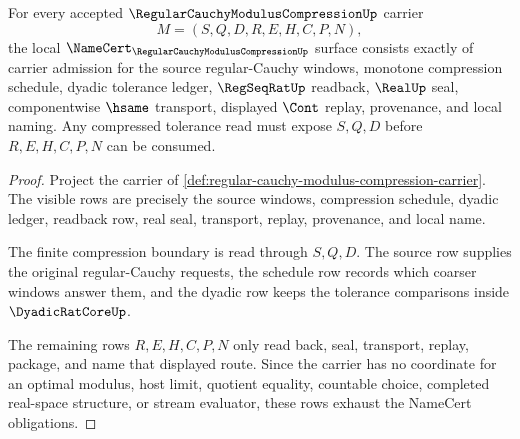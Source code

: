 \begin{theorem}
\label{thm:regular-cauchy-modulus-compression-namecert-obligations}
For every accepted $\RegularCauchyModulusCompressionUp$ carrier
$$
M=(S,Q,D,R,E,H,C,P,N),
$$
the local $\NameCert_{\RegularCauchyModulusCompressionUp}$ surface consists exactly of carrier admission for the source regular-Cauchy windows, monotone compression schedule, dyadic tolerance ledger, $\RegSeqRatUp$ readback, $\RealUp$ seal, componentwise $\hsame$ transport, displayed $\Cont$ replay, provenance, and local naming. Any compressed tolerance read must expose $S,Q,D$ before $R,E,H,C,P,N$ can be consumed.
\end{theorem}
\begin{proof}
Project the carrier of \autoref{def:regular-cauchy-modulus-compression-carrier}. The visible rows are precisely the source windows, compression schedule, dyadic ledger, readback row, real seal, transport, replay, provenance, and local name.

The finite compression boundary is read through $S,Q,D$. The source row supplies the original regular-Cauchy requests, the schedule row records which coarser windows answer them, and the dyadic row keeps the tolerance comparisons inside $\DyadicRatCoreUp$.

The remaining rows $R,E,H,C,P,N$ only read back, seal, transport, replay, package, and name that displayed route. Since the carrier has no coordinate for an optimal modulus, host limit, quotient equality, countable choice, completed real-space structure, or stream evaluator, these rows exhaust the NameCert obligations.
\end{proof}

